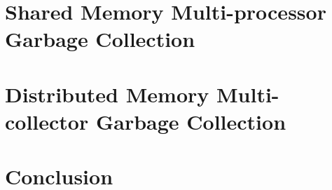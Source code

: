 \documentclass[12pt,letterpaper]{report}
\begin{document}
\begin{doublespace}
  \chapter{Shared Memory Multi-processor Garbage Collection}
 \label{shared}
   
  \chapter{Distributed Memory Multi-collector Garbage Collection}
     \label{distributed}
     
\chapter{Conclusion}
\label{conc}

  \end{doublespace}

\newpage 




%

\begin{singlespace}


\end{singlespace}


\newpage 
  \begin{doublespace}

  \end{doublespace}
\end{document}
